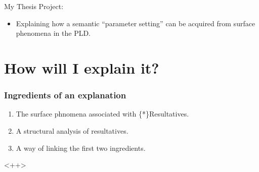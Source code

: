 \documentclass{beamer}
\begin{document}
\begin{frame}
  \begin{block}
    {My Thesis Project:}
    \begin{itemize}
      \item Explaining how a semantic ``parameter setting'' can be acquired from surface phenomena in the PLD.
    \end{itemize}
  \end{block}
\end{frame}
\section{How will I explain it?}
\begin{frame}
  \frametitle{Ingredients of an explanation}
  \begin{enumerate}
    \item The surface phnomena associated with \{*\}Resultatives.
    \item A structural analysis of resultatives.
    \item A way of linking the first two ingredients.
  \end{enumerate}
\end{frame}<++>
\end{document}
